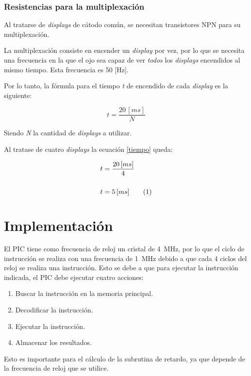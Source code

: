 \documentclass[12pt,a4paper]{article}
\newcommand\numberthis{\addtocounter{equation}{1}\tag{\theequation}}
\begin{document}
\newpage	
\subsubsection{Resistencias para la multiplexación}	
	Al tratarse de \emph{displays} de cátodo común, se necesitan transistores NPN para su multiplexación.
	
	La multiplexación consiste en encender un \emph{display} por vez, por lo que se necesita una frecuencia en la que el ojo sea capaz de ver \emph{todos} los \emph{displays} encendidos al mismo tiempo. Esta frecuencia es 50 [Hz].
	
	Por lo tanto, la fórmula para el tiempo \emph{t} de encendido de cada \emph{display} es la siguiente:

	\begin{equation}
	t = \frac{20\,[ms]}{N}
	\label{tiempo}
	\end{equation}
	
	 Siendo \emph{N} la cantidad de \emph{displays} a utilizar.
	 
	 Al tratase de cuatro \emph{displays} la ecuación \ref{tiempo} queda:
	 
	 \begin{align*}
	 t &= \frac{20\,[ms]}{4}\\
	 \\t &= 5\,[ms] \numberthis
	 \end{align*}

	 
\section{Implementación}
	El PIC tiene como frecuencia de reloj un cristal de \SI{4}{\MHz}, por lo que el ciclo de instrucción se realiza con una frecuencia de \SI{1}{\MHz} debido a que cada 4 ciclos del reloj se realiza una instrucción. Esto se debe a que para ejecutar la instrucción indicada, el PIC debe ejecutar cuatro acciones: 
	
	\begin{enumerate}[leftmargin=1.5cm,nosep]
	\item Buscar la instrucción en la memoria principal.
	\item Decodificar la instrucción.
	\item Ejecutar la instrucción.
	\item Almacenar los resultados.
	\end{enumerate}
	
	Esto es importante para el cálculo de la subrutina de retardo, ya que depende de la frecuencia de reloj que se utilice.
\end{document}
